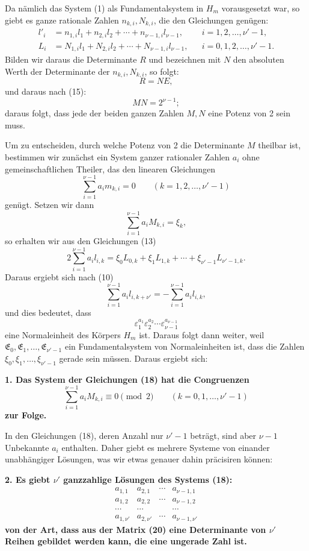 \documentclass[11pt]{article}
\begin{document}
Da nämlich das System (1) als Fundamentalsystem in $H_m$ vorausgesetzt war, so giebt es ganze rationale Zahlen $n_{k,i},N_{k,i}$, die den Gleichungen genügen:
\begin{equation}
\begin{aligned}
l'_i&=n_{1,i}l_1+n_{2,i}l_2+\cdots+n_{\nu-1,i}l_{\nu-1},&& i=1,2,\ldots,\nu'-1,\\
L_i&=N_{1,i}l_1+N_{2,i}l_2+\cdots+N_{\nu-1,i}l_{\nu-1},&& i=0,1,2,\ldots,\nu'-1.
\end{aligned}
\tag{17}
\end{equation}
Bilden wir daraus die Determinante $R$ und bezeichnen mit $N$ den absoluten Werth der Determinante der $n_{k,i},N_{k,i}$, so folgt:
\[
R=NE,
\]
und daraus nach (15):
\[
MN=2^{\nu-1};
\]
daraus folgt, dass jede der beiden ganzen Zahlen $M,N$ eine Potenz von 2 sein muss.

Um zu entscheiden, durch welche Potenz von 2 die Determinante $M$ theilbar ist, bestimmen wir zunächst ein System ganzer rationaler Zahlen $a_i$ ohne gemeinschaftlichen Theiler, das den linearen Gleichungen
\begin{equation}
\sum_{i=1}^{\nu-1}a_im_{k,i}=0\qquad(k=1,2,\ldots,\nu'-1)
\tag{18}
\end{equation}
genügt. Setzen wir dann
\[
\sum_{i=1}^{\nu-1}a_iM_{k,i}=\xi_k,
\]
so erhalten wir aus den Gleichungen (13)
\[
2\sum_{i=1}^{\nu-1}a_il_{i,k}=\xi_0L_{0,k}+\xi_1L_{1,k}+\cdots+\xi_{\nu'-1}L_{\nu'-1,k}.
\]
Daraus ergiebt sich nach (10)
\[
\sum_{i=1}^{\nu-1}a_il_{i,k+\nu'}=-\sum_{i=1}^{\nu-1}a_il_{i,k},
\]
und dies bedeutet, dass
\[
\varepsilon_1^{a_1}\varepsilon_2^{a_2}\cdots\varepsilon_{\nu-1}^{a_{\nu-1}}
\]
eine Normaleinheit des Körpers $H_m$ ist. Daraus folgt dann weiter, weil $\mathfrak E_0,\mathfrak E_1,\ldots,\mathfrak E_{\nu'-1}$ ein Fundamentalsystem von Normaleinheiten ist, dass die Zahlen $\xi_0,\xi_1,\ldots,\xi_{\nu'-1}$ gerade sein müssen. Daraus ergiebt sich:

\begin{center}\textbf{1. Das System der Gleichungen (18) hat die Congruenzen
\[
\sum_{i=1}^{\nu-1}a_iM_{k,i}\equiv0\pmod2\qquad(k=0,1,\ldots,\nu'-1)
\tag{19}
\]
zur Folge.}\end{center}

In den Gleichungen (18), deren Anzahl nur $\nu'-1$ beträgt, sind aber $\nu-1$ Unbekannte $a_i$ enthalten. Daher giebt es mehrere Systeme von einander unabhängiger Lösungen, was wir etwas genauer dahin präcisiren können:

\begin{center}\textbf{2. Es giebt $\nu'$ ganzzahlige Lösungen des Systems (18):}
\[
\begin{array}{cccc}
a_{1,1}&a_{2,1}&\cdots&a_{\nu-1,1}\\
a_{1,2}&a_{2,2}&\cdots&a_{\nu-1,2}\\
\cdots&\cdots&&\cdots\\
a_{1,\nu'}&a_{2,\nu'}&\cdots&a_{\nu-1,\nu'}
\end{array}
\tag{20}
\]
\textbf{von der Art, dass aus der Matrix (20) eine Determinante von $\nu'$ Reihen gebildet werden kann, die eine ungerade Zahl ist.}\end{center}
\end{document}
